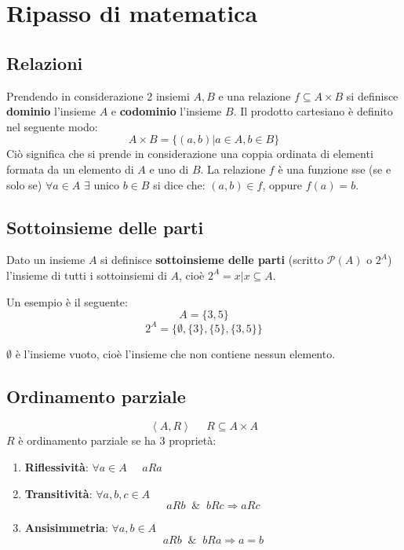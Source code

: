 \documentclass{article}
\theoremstyle{break}
\theoremstyle{break}
\theoremstyle{break}
\theoremstyle{break}
\begin{document}


\tableofcontents
\pagebreak

\section{Ripasso di matematica}
\subsection{Relazioni}
Prendendo in considerazione 2 insiemi \( A, B \) e una relazione \( f \subseteq A\times B \)
si definisce \textbf{dominio} l'insieme \( A \) e \textbf{codominio} l'insieme \( B \).
Il prodotto cartesiano è definito nel seguente modo:
\[
  A \times B = \{(a,b) | a \in A, b \in B\}
\]
Ciò significa che si prende in considerazione una coppia ordinata di elementi formata da
un elemento di \( A \) e uno di \( B \).
La relazione \( f \) è una funzione sse (se e solo se) \( \forall a \in A \) \( \exists \) unico \( b \in B \)
si dice che: \( (a,b) \in f \), oppure \( f(a) = b \).

\subsection{Sottoinsieme delle parti}
Dato un insieme \( A \) si definisce \textbf{sottoinsieme delle parti} (scritto \( \mathcal{P}(A) \) o \( 2^{A} \))
l'insieme di tutti i sottoinsiemi di \( A \), cioè \( 2^{A} = {x|x \subseteq A} \).

Un esempio è il seguente:
\[
  A = \{3, 5\}
\]
\[
  2^{A} = \{ \emptyset, \{3\}, \{5\}, \{3,5\} \}
\]

\( \emptyset \) è l'insieme vuoto, cioè l'insieme che non contiene nessun elemento.

\subsection{Ordinamento parziale}
\[
  \left<A, R\right>\;\;\;\;\; R \subseteq A \times A
\] 
\( R \) è ordinamento parziale se ha 3 proprietà:
\begin{enumerate}
  \item \textbf{Riflessività}: \( \forall a \in A\;\;\;\;\; aRa \) 
  \item \textbf{Transitività}: \( \forall a,b,c \in A \)
    \[
      aRb\;\; \&\;\; bRc \Rightarrow aRc
    \] 
  \item \textbf{Ansisimmetria}: \( \forall a,b \in A \) 
    \[
      aRb\;\; \& \;\; bRa \Rightarrow a=b
    \] 
\end{enumerate}
\end{document}

